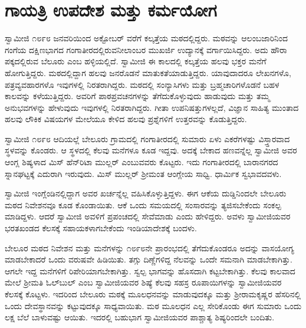 
\chapter{ಗಾಯತ್ರಿ ಉಪದೇಶ ಮತ್ತು ಕರ್ಮಯೋಗ}

\vskip 2pt

 ಸ್ವಾಮೀಜಿ ೧೮೯೮ ಜನವರಿಯಿಂದ ಅಕ್ಟೋಬರ್ ವರೆಗೆ ಕಲ್ಕತ್ತೆಯ ಮಠದಲ್ಲಿದ್ದರು. ಮಠವನ್ನು ಆಲಂಬಜಾರಿನಿಂದ ಗಂಗೆಯ ದಕ್ಷಿಣಭಾಗದ ಗಂಗಾತೀರದಲ್ಲಿರುವ\break ನೀಲಾಂಬರ ಮುಖರ್ಜಿ ಉದ್ಯಾನಕ್ಕೆ ವರ್ಗಾಯಿಸಿದ್ದರು. ಅದು ಹೌರಾ ಪಕ್ಕದಲ್ಲಿರುವ ಬೆಲೂರು ಎಂಬ ಹಳ್ಳಿಯಲ್ಲಿದೆ. ಸ್ವಾಮೀಜಿ ಈ ಕಾಲದಲ್ಲಿ ಕಲ್ಕತ್ತೆಯ ಹಲವು ಭಕ್ತರ ಮನೆಗೆ ಹೋಗುತ್ತಿದ್ದರು. ಮಠದಲ್ಲಿದ್ದಾಗ ಹಲವು ಜನರೊಡನೆ ಮಾತುಕತೆಯಾಡುತ್ತಿದ್ದರು. ಯಾವುದಾದರೂ ಲೇಖನಗಳೊ, ಪತ್ರವ್ಯವಹಾರಗಳೊ ಇವುಗಳಲ್ಲಿ ನಿರತರಾಗಿದ್ದರು. ಮಠದಲ್ಲಿ ಸಂನ್ಯಾಸಿಗಳು ಮತ್ತು ಬ್ರಹ್ಮಚಾರಿಗಳೊಡನೆ ಬಹಳ ಕಾಲವನ್ನು ಕಳೆಯುತ್ತಿದ್ದರು. ಅವರಿಗೆ ಪಾಠಪ್ರವಚನಗಳನ್ನು ತೆಗೆದುಕೊಳ್ಳುವುದು ಹಾಡುವುದು ಮತ್ತು ತಮ್ಮ ಅನುಭವಗಳನ್ನು ಹೇಳುವುದು ಇವುಗಳಲ್ಲಿ ನಿರತರಾಗಿದ್ದರು. ಗೀತಾ ಉಪನಿಷತ್ತುಗಳಲ್ಲದೆ, ವಿಜ್ಞಾನ ಸಾಹಿತ್ಯ ಮುಂತಾದ ಹಲವು ಲೌಕಿಕ ವಿಷಯಗಳ ಮೇಲೆಯೂ ಕೇಳಿದ ಹಲವು ಪ್ರಶ್ನೆಗಳಿಗೆ ಉತ್ತರವನ್ನು ಕೊಡುತ್ತಿದ್ದರು. 

\vskip 2pt

 ಸ್ವಾಮೀಜಿ ೧೮೯೮ ಆದಿಯಲ್ಲೆ ಬೇಲೂರು ಗ್ರಾಮದಲ್ಲಿ ಗಂಗಾತೀರದಲ್ಲಿ ಸುಮಾರು ಏಳು ಎಕರೆಗಳಷ್ಟು ವಿಸ್ತ್ತಾರವಾದ ಸ್ಥಳವನ್ನು ಕೊಂಡರು. ಆ ಸ್ಥಳದಲ್ಲಿ ಕೆಲವು ಮನೆಗಳೂ ಕೂಡ ಇದ್ದವು. ಅದಕ್ಕೆ ಬೇಕಾದ ಹಣವನ್ನೆಲ್ಲ ಸ್ವಾಮೀಜಿ ಅವರ ಆಂಗ್ಲ ಶಿಷ್ಯಳಾದ ಮಿಸ್ ಹೆನ್‍ರಿಟಾ ಮುಲ್ಲರ್ ಎಂಬುವವರು ಕೊಟ್ಟರು. ಇದು ಗಂಗಾತೀರದಲ್ಲಿ ಬಾರಾನಗರದ ಸ್ನಾನಘಟ್ಟಕ್ಕೆ ಎದುರಾಗಿ ಇರುವುದು. ಮಿಸ್ ಮುಲ್ಲರ್ ಶ‍್ರೀಮಂತ ಆಂಗ್ಲೇಯ ಸಾಧ್ವಿ. ಧಾರ್ಮಿಕ ಸ್ವಭಾವದವಳು. 

 ಸ್ವಾಮೀಜಿ ಇಂಗ್ಲೆಂಡಿನಲ್ಲಿದ್ದಾಗ ಅವರ ಖರ್ಚನ್ನೆಲ್ಲ ವಹಿಸಿಕೊಳ್ಳುತ್ತಿದ್ದಳು. ಈಗ ಆಕೆಯ ದುಡ್ಡಿನಿಂದಲೇ‌ ಬೇಲೂರು ಮಠದ ನಿವೇಶನವೂ ಕೂಡ ಕೊಂಡಾಯಿತು. ಆಕೆ ಒಂದು ಸಮಯದಲ್ಲಿ ಸಂಸಾರವನ್ನು ತ್ಯಜಿಸಬೇಕೆಂದು ಸಂಕಲ್ಪ ಮಾಡಿದ್ದಳು. ಆದರೆ ಸ್ವಾಮೀಜಿ ಅವಳಿಗೆ ಪ್ರಪಂಚದಲ್ಲಿ ಸೇವೆಮಾಡು ಎಂದು ಹೇಳಿದ್ದರು. ಅವಳು ಸ್ವಾಮೀಜಿಯವರ ಭರತಖಂಡದ ಕೆಲಸಕ್ಕೆ ಸಹಾಯಕಳಾಗಬೇಕೆಂದು ಇಂಡಿಯಾದೇಶಕ್ಕೆ ಬಂದಳು. 

 ಬೇಲೂರ ಮಠದ ನಿವೇಶನ ಮತ್ತು ಮನೆಗಳನ್ನು ೧೮೯೮ನೇ ಪ್ರಾರಂಭದಲ್ಲಿ ತೆಗೆದುಕೊಂಡರೂ ಅದನ್ನು ವಾಸಯೋಗ್ಯ ಮಾಡಬೇಕಾದರೆ ಒಂದು ವರುಷವೇ ಹಿಡಿಯಿತು. ತಗ್ಗು ದಿಣ್ಣೆಗಳಿದ್ದ ನೆಲವನ್ನು ಒಂದೇ ಸಮನಾಗಿ ಮಾಡಬೇಕಾಗಿತ್ತು. ಆಗಲೇ ಇದ್ದ ಮನೆಗಳಿಗೆ ರಿಪೇರಿಯಾಗಬೇಕಾಗಿತ್ತು. ಸ್ವಲ್ಪ ಭಾಗವನ್ನು ಹೊಸದಾಗಿ ಕಟ್ಟಬೇಕಾಗಿತ್ತು. ಕೆಲವು ಕಾಲವಾದ ಮೇಲೆ ಶ‍್ರೀಮತಿ ಓಲ್‍ಬುಲ್ ಎಂಬ ಸ್ವಾಮೀಜಿಯವರ ಶಿಷ್ಯೆ ಕೆಲವು ಸಹಸ್ರ ರೂಪಾಯಿಗಳನ್ನು ಸ್ವಾಮೀಜಿಯವರ ಕೆಲಸಕ್ಕೆ ಕೊಟ್ಟಳು. ಇದರಿಂದ ಬೇಲೂರು ಮಠಕ್ಕೆ ಮೂಲಧನವನ್ನು ಮಾಡುವುದಕ್ಕೂ ಮತ್ತು ಶ‍್ರೀರಾಮಕೃಷ್ಣರ ಹೆಸರಿನಲ್ಲಿ ಒಂದು ದೇವಸ್ಥಾನವನ್ನು ಕಟ್ಟುವುದಕ್ಕೂ ಸಾಧ್ಯವಾಯಿತು. ಮಠ ಮೂಲಧನ ಎಲ್ಲ ಸೇರಿಕೊಂಡು ಈಗ ಸುಮಾರು ಒಂದು ಲಕ್ಷ ಬೆಲೆ ಬಾಳುವಷ್ಟು ಆಯಿತು. ಇದರಲ್ಲಿ ಬಹುಭಾಗ ಸ್ವಾಮೀಜಿಯವರ ಪಾಶ್ಚಾತ್ಯ ಶಿಷ್ಯರಿಂದಲೇ ಬಂದಿತು. 

